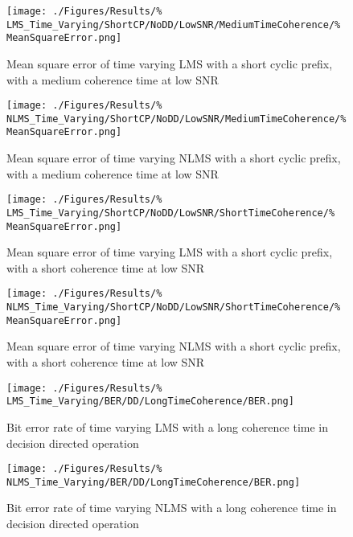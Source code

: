 \begin{figure}[ht]
	\centering
	\begin{minipage}{0.49\textwidth}
		\centering
		\texttt{[image: ./Figures/Results/\%
	LMS\_Time\_Varying/ShortCP/NoDD/LowSNR/MediumTimeCoherence/\%
	MeanSquareError.png]}
		\captionsetup{width=0.75\linewidth}
		\caption{Mean square error of time varying LMS with a 
		short cyclic prefix, with a medium coherence time at 
		low SNR}
	\end{minipage}
	\begin{minipage}{0.49\textwidth}
		\centering
		\texttt{[image: ./Figures/Results/\%
	NLMS\_Time\_Varying/ShortCP/NoDD/LowSNR/MediumTimeCoherence/\%
	MeanSquareError.png]}
		\captionsetup{width=0.75\linewidth}
		\caption{Mean square error of time varying NLMS with 
		a short cyclic prefix, with a medium coherence 
		time at low SNR}
	\end{minipage}
\end{figure}

\begin{figure}[ht]
	\centering
	\begin{minipage}{0.49\textwidth}
		\centering
		\texttt{[image: ./Figures/Results/\%
	LMS\_Time\_Varying/ShortCP/NoDD/LowSNR/ShortTimeCoherence/\%
	MeanSquareError.png]}
		\captionsetup{width=0.75\linewidth}
		\caption{Mean square error of time varying LMS with a 
		short cyclic prefix, with a short coherence time at 
		low SNR}
	\end{minipage}
	\begin{minipage}{0.49\textwidth}
		\centering
		\texttt{[image: ./Figures/Results/\%
	NLMS\_Time\_Varying/ShortCP/NoDD/LowSNR/ShortTimeCoherence/\%
	MeanSquareError.png]}
		\captionsetup{width=0.75\linewidth}
		\caption{Mean square error of time varying NLMS with 
		a short cyclic prefix, with a short coherence time 
		at low SNR}
	\end{minipage}
\end{figure}

\begin{figure}[ht]
	\centering
	\begin{minipage}{0.49\textwidth}
		\centering
		\texttt{[image: ./Figures/Results/\%
	LMS\_Time\_Varying/BER/DD/LongTimeCoherence/BER.png]}
		\captionsetup{width=0.75\linewidth}
		\caption{Bit error rate of time varying LMS with a 
		long coherence time in decision directed 
		operation}
	\end{minipage}
	\begin{minipage}{0.49\textwidth}
		\centering
		\texttt{[image: ./Figures/Results/\%
	NLMS\_Time\_Varying/BER/DD/LongTimeCoherence/BER.png]}
		\captionsetup{width=0.75\linewidth}
		\caption{Bit error rate of time varying NLMS with a 
		long coherence time in decision directed 
		operation}
		\label{fig:NLMS-BER-Long-DD-TV}
	\end{minipage}
\end{figure}

